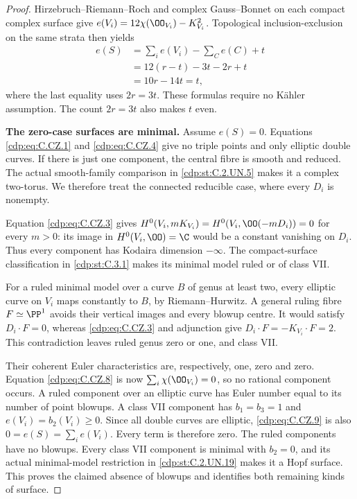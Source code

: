 \begin{proof}
Hirzebruch--Riemann--Roch and complex Gauss--Bonnet
on each compact complex surface give
$e(V_i)=12\chi(\OO_{V_i})-K_{V_i}^2$.
Topological inclusion-exclusion on the same strata
then yields
\[
 \begin{aligned}
 e(S)&=\sum_i e(V_i)-\sum_C e(C)+t\\
     &=12(r-t)-3t-2r+t\\
     &=10r-14t=t,
 \end{aligned}
\tag{C.CZ.9}\label{cdp:eq:C.CZ.9}
\]
where the last equality uses $2r=3t$.
These formulas require no K\"ahler assumption.
The count $2r=3t$ also makes $t$ even.

\par\medskip\noindent\textbf{The zero-case surfaces are minimal.}
Assume $e(S)=0$. Equations \eqref{cdp:eq:C.CZ.1} and \eqref{cdp:eq:C.CZ.4}
give no triple points and only elliptic double
curves. If there is just one component, the
central fibre is smooth and reduced. The
actual smooth-family comparison in \ref{cdp:st:C.2.UN.5} makes
it a complex two-torus. We therefore treat
the connected reducible case, where every
$D_i$ is nonempty.

Equation \eqref{cdp:eq:C.CZ.3} gives
$H^0(V_i,mK_{V_i})=H^0(V_i,\OO(-mD_i))=0$
for every $m>0$: its image in $H^0(V_i,\OO)=\C$
would be a constant vanishing on $D_i$.
Thus every component has Kodaira dimension
$-\infty$. The compact-surface classification
in \ref{cdp:st:C.3.1} makes its minimal model ruled or
of class VII.

For a ruled minimal model over a curve $B$
of genus at least two, every elliptic curve
on $V_i$ maps constantly to $B$, by
Riemann--Hurwitz. A general ruling fibre
$F\simeq\PP^1$ avoids their vertical images
and every blowup centre. It would satisfy
$D_i\cdot F=0$, whereas \eqref{cdp:eq:C.CZ.3} and
adjunction give $D_i\cdot F=-K_{V_i}\cdot F=2$.
This contradiction leaves ruled genus zero
or one, and class VII.

Their coherent Euler characteristics are,
respectively, one, zero and zero. Equation
\eqref{cdp:eq:C.CZ.8} is now $\sum_i\chi(\OO_{V_i})=0$,
so no rational component occurs. A ruled
component over an elliptic curve has Euler
number equal to its number of point blowups.
A class VII component has $b_1=b_3=1$ and
$e(V_i)=b_2(V_i)\ge0$. Since all double
curves are elliptic, \eqref{cdp:eq:C.CZ.9} is also
$0=e(S)=\sum_i e(V_i)$. Every term is
therefore zero. The ruled components have
no blowups. Every class VII component is
minimal with $b_2=0$, and its actual
minimal-model restriction in \ref{cdp:st:C.2.UN.19} makes
it a Hopf surface. This proves the claimed
absence of blowups and identifies both
remaining kinds of surface.


\end{proof}
